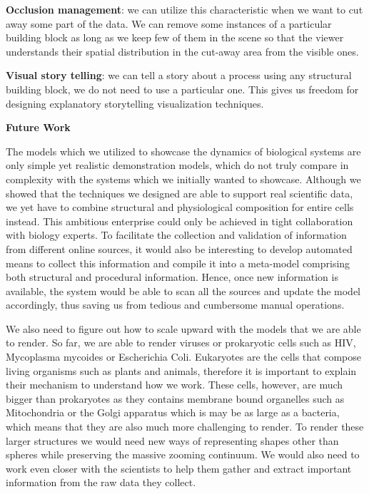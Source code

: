\textbf{Occlusion management}: we can utilize this characteristic when we want to cut away some part of the data. We can remove some instances of a particular building block as long as we keep few of them in the scene so that the viewer understands their spatial distribution in the cut-away area from the visible ones.

\textbf{Visual story telling}: we can tell a story about a process using any structural building block, we do not need to use a particular one. This gives us freedom for designing explanatory storytelling visualization techniques.

\textbf{Future Work}

The models which we utilized to showcase the dynamics of biological systems are only simple yet realistic demonstration models, which do not truly compare in complexity with the systems which we initially wanted to showcase.
Although we showed that the techniques we designed are able to support real scientific data, we yet have to combine structural and physiological composition for entire cells instead.
This ambitious enterprise could only be achieved in tight collaboration with biology experts.
To facilitate the collection and validation of information from different online sources, it would also be interesting to develop automated means to collect this information and compile it into a meta-model comprising both structural and procedural information.
Hence, once new information is available, the system would be able to scan all the sources and update the model accordingly, thus saving us from tedious and cumbersome manual operations.

We also need to figure out how to scale upward with the models that we are able to render.
So far, we are able to render viruses or prokaryotic cells such as HIV, Mycoplasma mycoides or Escherichia Coli. 
Eukaryotes are the cells that compose living organisms such as plants and animals, therefore it is important to explain their mechanism to understand how we work.
These cells, however, are much bigger than prokaryotes as they contains membrane bound organelles such as Mitochondria or the Golgi apparatus which is may be as large as a bacteria, which means that they are also much more challenging to render.
To render these larger structures we would need new ways of representing shapes other than spheres while preserving the massive zooming continuum.
We would also need to work even closer with the scientists to help them gather and extract important information from the raw data they collect.

